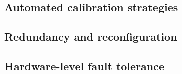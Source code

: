 \subsection{Automated calibration strategies}

\subsection{Redundancy and reconfiguration}

\subsection{Hardware-level fault tolerance}











